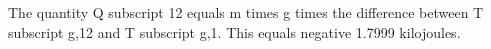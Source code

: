 The quantity Q subscript 12 equals m times g times the difference between T subscript g,12 and T subscript g,1. This equals negative 1.7999 kilojoules.